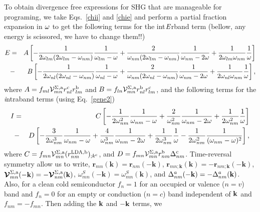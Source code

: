 \documentclass{article}
\begin{document}
To obtain divergence free expressions for SHG that are manageable for
programing, we take Eqs.~\eqref{chii} and \eqref{chie} and perform
a partial fraction  expansion in $\omega$ to get the following terms for
the int$\it E$rband term (bellow, any energy is scissored, we have to
change them!!)
\begin{eqnarray}\label{pfe}  
E&=&  
A
\left[
-\frac{1}{2\omega_{lm}(2\omega_{lm}-\omega_{nm})}\frac{1}{\omega_{lm}-\omega}
+\frac{2}{\omega_{nm}(2\omega_{lm}-\omega_{nm})}\frac{1}{\omega_{nm}-2\omega}
+\frac{1}{2\omega_{lm}\omega_{nm}}\frac{1}{\omega}
\right]
\nonumber\\
&-& 
B
\left[
-\frac{1}{2\omega_{nl}(2\omega_{nl}-\omega_{nm})}\frac{1}{\omega_{nl}-\omega}
+\frac{2}{\omega_{nm}(2\omega_{nl}-\omega_{nm})}\frac{1}{\omega_{nm}-2\omega}
+\frac{1}{2\omega_{nl}\omega_{nm}}\frac{1}{\omega}
\right]
,
\end{eqnarray}  
where 
$A=f_{ml}{\cal V}^{\Sigma,\mathrm{a}}_{mn}r^{\mathrm{c}}_{nl}r^{\mathrm{b}}_{lm}$   
and
$B=f_{ln}{\cal V}^{\Sigma,\mathrm{a}}_{mn}r^{\mathrm{b}}_{nl}r^{\mathrm{c}}_{lm}$,  
and the following terms for the {\it i}ntraband terms
 (using Eq.~\eqref{gene2})
\begin{eqnarray}\label{pfi} 
I&=& 
C
\left[
-\frac{1}{2\omega^2_{nm}}\frac{1}{\omega_{nm}-\omega}
+\frac{2}{\omega^2_{nm}}\frac{1}{\omega_{nm}-2\omega}
+\frac{1}{2\omega^2_{nm}}\frac{1}{\omega}
\right]
\nonumber\\
&-&D
\left[
-\frac{3}{2\omega^3_{nm}}\frac{1}{\omega_{nm}-\omega}
+\frac{4}{\omega^3_{nm}}\frac{1}{\omega_{nm}-2\omega}
+\frac{1}{2\omega^3_{nm}}\frac{1}{\omega}
-\frac{1}{2\omega^2_{nm}}\frac{1}{(\omega_{nm}-\omega)^2}
\right]
,
\end{eqnarray} 
where 
$C=f_{mn}{\cal V}^{\Sigma,\mathrm{a}}_{mn}(r^{\mathrm{LDA},\mathrm{b}}_{nm})_{;k^{\mathrm{c}}}$, 
and
$D=f_{mn}{\cal V}^{\Sigma,\mathrm{a}}_{mn}r^{\mathrm{b}}_{nm}\Delta^{\mathrm{c}}_{nm}$.
Time-reversal symmetry allow us to write,
$\mathbf{r}_{mn}(\mathbf{k})=\mathbf{r}_{nm}(-\mathbf{k})$,
$\mathbf{r}_{mn;\mathbf{k}}(\mathbf{k})=-\mathbf{r}_{nm;\mathbf{k}}(-\mathbf{k})$,
$\boldsymbol{\mathcal{\cal V}}_{mn}^{\Sigma,\mathrm{a}}(-\mathbf{k})=-\boldsymbol{\mathcal{\cal V}}_{nm}^{\Sigma,\mathrm{a}}(\mathbf{k})$,
$\omega_{mn}^{S}(-\mathbf{k})=\omega_{mn}^{S}(\mathbf{k})$,
and
$\Delta^a_{nm}(-\mathbf{k})=-\Delta^a_{nm}(\mathbf{k})$.
Also, for a clean cold semiconductor $f_n=1$  for an occupied or
valence ($n=v$) band and $f_n=0$
for an empty or conduction ($n=c$) band independent of $\mathbf{k}$ and
$f_{nm}=-f_{mn}$. 
Then adding the $\mathbf{k}$ and $-\mathbf{k}$ terms, we
\end{document}
